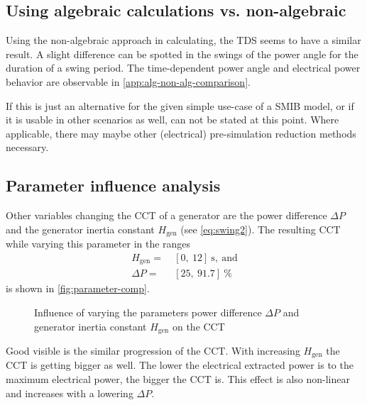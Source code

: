 \subsection{Using algebraic calculations vs. non-algebraic}

Using the non-algebraic approach in calculating, the \acs{TDS} seems to have a similar result. A slight difference can be spotted in the swings of the power angle for the duration of a swing period. The time-dependent power angle and electrical power behavior are observable in \autoref{app:alg-non-alg-comparison}.

If this is just an alternative for the given simple use-case of a \acs{SMIB} model, or if it is usable in other scenarios as well, can not be stated at this point. Where applicable, there may maybe other (electrical) pre-simulation reduction methods necessary.



\subsection{Parameter influence analysis}

Other variables changing the \acs{CCT} of a generator are the power difference $\Delta P$ and the generator inertia constant $H_\mathrm{gen}$ (see \autoref{eq:swing2}). The resulting \acs{CCT} while varying this parameter in the ranges
\begin{align}
        H_\mathrm{gen}=&~[0,~12]~\mathrm{s},~\mathrm{and} \nonumber \\
        \Delta P=&~[25,~91.7]~\% \nonumber
\end{align}
is shown in \autoref{fig:parameter-comp}.

\begin{figure}[h]
        \centering
        
        \caption[Influence of parameter variation on the \acs{CCT}]{Influence of varying the parameters power difference $\Delta P$ and generator inertia constant $H_\mathrm{gen}$ on the \acf{CCT}}
        \label{fig:parameter-comp}
\end{figure}

Good visible is the similar progression of the \acs{CCT}. With increasing $H_\mathrm{gen}$ the \acs{CCT} is getting bigger as well. The lower the electrical extracted power is to the maximum electrical power, the bigger the \acs{CCT} is. This effect is also non-linear and increases with a lowering $\Delta P$.

